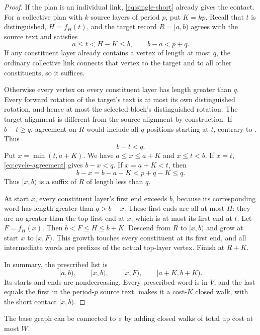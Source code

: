 \begin{proof}
If the plan is an individual link, \eqref{eq:single-short} already gives the contact. For a collective plan with $k$ source layers of period $p$, put $K=kp$. Recall that $t$ is distinguished, $H=f_H(t)$, and the target record $R=[a,b)$ agrees with the source text and satisfies
\[
a\le t<H-K\le b,\qquad b-a<p+q.
\]
If any constituent layer already contains a vertex of length at most $q$, the ordinary collective link connects that vertex to the target and to all other constituents, so it suffices.

Otherwise every vertex on every constituent layer has length greater than $q$. Every forward rotation of the target's text is at most its own distinguished rotation, and hence at most the selected block's distinguished rotation. The target alignment is different from the source alignment by construction. If $b-t\ge q$, agreement on $R$ would include all $q$ positions starting at $t$, contrary to . Thus
\begin{equation}\label{eq:cycle-agreement}
b-t<q.
\end{equation}
Put $x=\min(t,a+K)$. We have $a\le x\le a+K$ and $x\le t<b$. If $x=t$, \eqref{eq:cycle-agreement} gives $b-x<q$. If $x=a+K<t$, then
\[
b-x=b-a-K<p+q-K\le q.
\]
Thus $[x,b)$ is a suffix of $R$ of length less than $q$.

At start $x$, every constituent layer's first end exceeds $b$, because its corresponding word has length greater than $q>b-x$. These first ends are all at most $H$: they are no greater than the top first end at $x$, which is at most its first end at $t$. Let $F=f_H(x)$. Then $b<F\le H\le b+K$. Descend from $R$ to $[x,b)$ and grow at start $x$ to $[x,F)$. This growth touches every constituent at its first end, and all intermediate words are prefixes of the actual top-layer vertex. Finish at $R+K$.

In summary, the prescribed list is
\begin{equation}\label{eq:cycle-list}
[a,b),\qquad[x,b),\qquad[x,F),\qquad[a+K,b+K).
\end{equation}
Its starts and ends are nondecreasing. Every prescribed word is in $V$, and the last equals the first in the period-$p$ source text.  makes it a cost-$K$ closed walk, with the short contact $[x,b)$.
\end{proof}

\begin{theorem}\label{thm:connection}
The base graph can be connected to $\varepsilon$ by adding closed walks of total up cost at most $W$.
\end{theorem}

